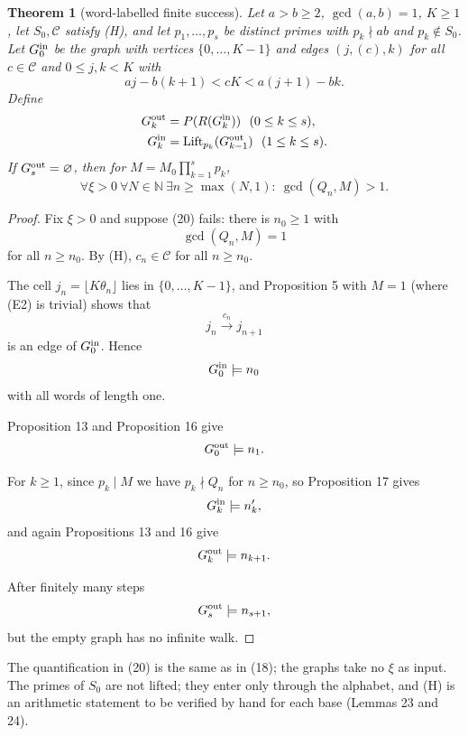 \documentclass[11pt,reqno]{amsart}
\newtheorem{theorem}{Theorem}
\theoremstyle{definition}
\theoremstyle{remark}
\begin{document}
\begin{samepage}
\begin{theorem}[word-labelled finite success]\leavevmode\label{thm:19}
Let \(a>b\ge2\),
\(\gcd(a,b)=1\), \(K\ge1\), let \(S_0,\mathcal C\) satisfy (H), and let
\(p_1,\ldots,p_s\) be distinct primes with \(p_k\nmid ab\) and
\(p_k\notin S_0\). Let \(G_0^{\rm in}\) be the graph with vertices
\(\{0,\ldots,K-1\}\) and edges \((j,(c),k)\) for all \(c\in\mathcal C\)
and \(0\le j,k<K\) with
\[
aj-b(k+1)<cK<a(j+1)-bk.
\]
Define
\[
\begin{aligned}
G_k^{\rm out}&=P(R(G_k^{\rm in}))\ \ (0\le k\le s),\\
G_k^{\rm in}&=\operatorname{Lift}_{p_k}(G_{k-1}^{\rm out})\ \ (1\le k\le s).
\end{aligned}
\]
If \(G_s^{\rm out}=\varnothing\), then for \(M=M_0\prod_{k=1}^sp_k\),
\[
\forall\xi>0\ \forall N\in\mathbb N\ \exists n\ge\max(N,1):\
\gcd(Q_n,M)>1.
\tag{20}\label{eq:20}
\]
\label{thm-end:19}
\end{theorem}
\end{samepage}

\begin{proof}\leavevmode\label{proof:19}
Fix \(\xi>0\) and suppose (20) fails: there is \(n_0\ge1\)
with
\[
\gcd(Q_n,M)=1
\]
for all \(n\ge n_0\). By (H), \(c_n\in\mathcal C\)
for all \(n\ge n_0\).

The cell
\(j_n=\lfloor K\theta_n\rfloor\)
lies in
\(\{0,\ldots,K-1\}\), and Proposition 5 with \(M=1\) (where (E2) is
trivial) shows that
\[
j_n\xrightarrow{c_n}j_{n+1}
\]
is an edge of
\(G_0^{\rm in}\). Hence
\[
G_0^{\rm in}\models n_0
\]
with all words of
length one.

Proposition 13 and Proposition 16 give
\[
G_0^{\rm out}\models n_1.
\]

For \(k\ge1\), since \(p_k\mid M\) we have
\(p_k\nmid Q_n\) for \(n\ge n_0\), so Proposition 17 gives
\[
G_k^{\rm in}\models n'_k,
\]
and again Propositions 13 and 16 give
\[
G_k^{\rm out}\models n_{k+1}.
\]

After finitely many steps
\[
G_s^{\rm out}\models n_{s+1},
\]
but the empty graph has no infinite
walk. \qedhere
\end{proof}

The quantification in (20) is the same as in (18); the graphs take no
\(\xi\) as input. The primes of \(S_0\) are not lifted; they enter only
through the alphabet, and (H) is an arithmetic statement to be verified
by hand for each base (Lemmas 23 and 24).
\end{document}
